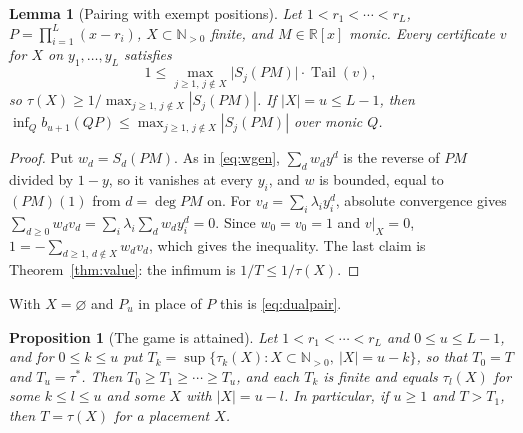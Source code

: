 \documentclass[11pt]{article}
\newtheorem{lemma}[theorem]{Lemma}
\newtheorem{proposition}[theorem]{Proposition}
\theoremstyle{definition}
\theoremstyle{plain}
\newcommand{\R}{\mathbb R}
\newcommand{\N}{\mathbb N}
\DeclareMathOperator{\Tail}{Tail}
\begin{document}
\begin{lemma}[Pairing with exempt positions]\label{lem:exemptpair}
Let $1<r_1<\cdots<r_L$, $P=\prod_{i=1}^L(x-r_i)$, $X\subset\N_{>0}$ finite,
and $M\in\R[x]$ monic.  Every certificate $v$ for $X$ on $y_1,\ldots,y_L$
satisfies
\[
  1\le\max_{j\ge1,\,j\notin X}\bigl|S_j(PM)\bigr|\cdot\Tail(v),
\]
so $\tau(X)\ge1/\max_{j\ge1,\,j\notin X}|S_j(PM)|$.  If $|X|=u\le L-1$, then
$\inf_Qb_{u+1}(QP)\le\max_{j\ge1,\,j\notin X}|S_j(PM)|$ over monic $Q$.
\end{lemma}

\begin{proof}
Put $w_d=S_d(PM)$.  As in \eqref{eq:wgen}, $\sum_dw_dy^d$ is the reverse of
$PM$ divided by $1-y$, so it vanishes at every $y_i$, and $w$ is bounded,
equal to $(PM)(1)$ from $d=\deg PM$ on.  For $v_d=\sum_i\lambda_iy_i^d$,
absolute convergence gives
$\sum_{d\ge0}w_dv_d=\sum_i\lambda_i\sum_dw_dy_i^d=0$.  Since
$w_0=v_0=1$ and $v|_X=0$, $1=-\sum_{d\ge1,\,d\notin X}w_dv_d$, which gives
the inequality.  The last claim is Theorem~\ref{thm:value}:
the infimum is $1/T\le1/\tau(X)$.
\end{proof}

With $X=\varnothing$ and $P_u$ in place of $P$ this is \eqref{eq:dualpair}.

\begin{proposition}[The game is attained]\label{prop:attainT}
Let $1<r_1<\cdots<r_L$ and $0\le u\le L-1$, and for $0\le k\le u$ put
$T_k=\sup\{\tau_k(X):X\subset\N_{>0},\ |X|=u-k\}$, so that $T_0=T$ and
$T_u=\tau^*$.  Then $T_0\ge T_1\ge\cdots\ge T_u$, and each $T_k$ is finite
and equals $\tau_l(X)$ for some $k\le l\le u$ and some $X$ with $|X|=u-l$.
In particular, if $u\ge1$ and $T>T_1$, then $T=\tau(X)$ for a placement $X$.
\end{proposition}
\end{document}
